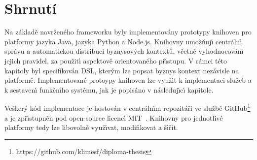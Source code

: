 \section{Shrnutí}

Na základě navrženého frameworku byly implementovány prototypy
knihoven pro platformy jazyka Java, jazyka Python a
Node.js. Knihovny umožňuj\'{\i} centráln\'{\i} správu a automatickou distribuci
byznysov\'ych kontextů, včetně vyhodnocován\'{\i} jejich pravidel, za
použit\'{\i} aspektově orientovaného př\'{\i}stupu.
V rámci této kapitoly byl specifikován \gls{DSL}, kter\'ym lze popsat
byznys kontext nezávisle na platformě.
Implementované protoypy knihoven lze využ\'{\i}t k implementaci služeb a k sestaven\'{\i}
funkčn\'{\i}ho systému, jak je popisáno v následuj\'{\i}c\'{\i} kapitole.

Vešker\'y kód implementace je hostován v centráln\'{\i}m repozitáři
ve službě GitHub\footnote{https://github.com/klimesf/diploma-thesis}
a je zpř\'{\i}stupněn pod open-source licenc\'{\i} MIT~\cite{mitlicense}.
Knihovny pro jednotlivé platformy tedy lze libovolně
využ\'{\i}vat, modifikovat a š\'{\i}řit.
